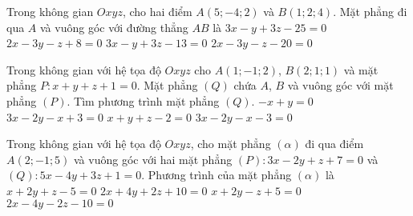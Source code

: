 \begin{ex}%
	Trong không gian $Oxyz$, cho hai điểm $A(5;-4;2)$ và $B(1;2;4)$. Mặt phẳng đi qua $A$ và vuông góc với đường thẳng $AB$ là
	\choice
	{$ 3x - y + 3z - 25 = 0 $}
	{$ 2x - 3y -z + 8 = 0 $}
	{$ 3x - y + 3z - 13 = 0 $}
	{\True $ 2x - 3y - z -20 = 0  $}
\end{ex}

\begin{ex}%
	Trong không gian với hệ tọa độ $Oxyz$ cho $A \left(1;-1;2\right)$, $ B\left(2;1;1\right)$ và mặt phẳng
	$P\colon x+y+z+1=0$. Mặt phẳng $(Q)$ chứa $A$, $B$ và vuông góc với mặt phẳng $(P)$. Tìm phương trình mặt phẳng $(Q)$.
	\choice
	{$-x+y=0$}
	{$3x-2y-x+3=0$}
	{$x+y+z-2=0$}
	{\True $3x-2y-x-3=0$}
\end{ex}
\begin{ex}%
	Trong không gian với hệ tọa độ $Oxyz$, cho mặt phẳng $(\alpha)$ đi qua điểm $A(2; -1; 5)$ và vuông góc với hai mặt phẳng $(P): 3x - 2y + z + 7 = 0$ và $(Q): 5x - 4y + 3z + 1 = 0$. Phương trình của mặt phẳng $(\alpha)$ là 
	\choice
	{\True $x + 2y + z - 5 = 0$}
	{$2x + 4y + 2z + 10 = 0$}
	{$x + 2y - z + 5 = 0$}
	{$2x - 4y - 2z - 10 = 0$}
\end{ex}


